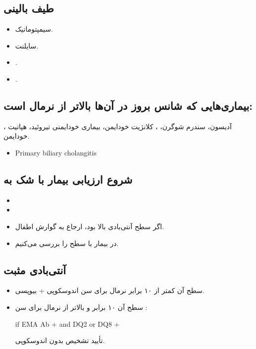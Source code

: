 \documentclass[12pt,a4paper]{article}
\begin{document}
\subsection*{طیف بالینی }
\begin{itemize}
\item سیمپتوماتیک.
\item سایلنت.
\item {}.
\item {}.
\end{itemize}

\subsection*{بیماری‌هایی که شانس بروز  در آن‌ها بالاتر از نرمال است:}
، آدیسون، سندرم شوگرن، ، کلانژیت خودایمن، بیماری خودایمنی تیروئید، هپاتیت خودایمن.
\begin{latin}
\begin{itemize}
\item Primary biliary cholangitis
\end{itemize}
\end{latin}

\subsection*{شروع ارزیابی بیمار با شک به }
\begin{itemize}
\item {}
\item {}
\end{itemize}
\begin{itemize}
\item اگر سطح آنتی‌بادی بالا بود، ارجاع به گوارش اطفال.
\item در بیمار با  \CeliacArrow{} سطح  را بررسی می‌کنیم.
\end{itemize}

\subsection*{آنتی‌بادی مثبت}
\begin{itemize}
\item سطح آن کمتر از ۱۰ برابر نرمال برای سن \CeliacArrow{} اندوسکوپی + بیوپسی.
\item سطح آن ۱۰ برابر و بالاتر از نرمال برای سن \CeliacArrow{} :
  \begin{latin}
  if EMA Ab + and DQ2 or DQ8 +
  \end{latin}
  \CeliacArrow{} تأیید تشخیص  بدون اندوسکوپی.
\end{itemize}
\end{document}
